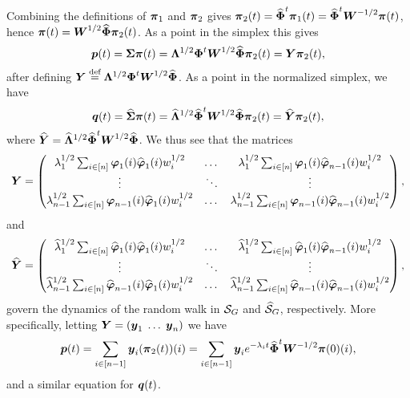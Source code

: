 Combining the  definitions of $\bpi_1$  and $\bpi_2$ gives $\bpi_2(t)  = \Eign^\tp \bpi_1(t) = \Eign^\tp \W^{-1/2}\bpi(t)$, hence 
$\bpi(t) = \W^{1/2} \Eign \bpi_2(t)$. As a point in the  simplex this gives 
\begin{equation*}
\p(t)  = \Sv\bpi(t) = \Eval^{1/2}\Eig^\tp \W^{1/2}\Eign \bpi_2(t) = \Y\bpi_2(t),
\end{equation*}
after defining $\Y\equiv \Eval^{1/2}\Eig^\tp \W^{1/2}\Eign$. As a point in the normalized simplex, we have 
\begin{equation*}
\q(t) = \Svn\bpi(t) = \Evaln^{1/2}\Eign^\tp\W^{1/2}\Eign\bpi_2(t) = \Yn\bpi_2(t),
\end{equation*}
where $\Yn= \Evaln^{1/2}\Eign^\tp\W^{1/2}\Eign$. We thus  see that the matrices 
\begin{equation*}
\Y = \begin{pmatrix}
\lambda_1^{1/2}\sum_{i\in[n]} \vp_1(i)\vpn_1(i) w_i^{1/2} & \dots &  \lambda_1^{1/2}\sum_{i\in[n]} \vp_1(i)\vpn_{n-1}(i) w_i^{1/2} \\
\vdots & \ddots & \vdots \\
\lambda_{n-1}^{1/2}\sum_{i\in[n]} \vp_{n-1}(i)\vpn_1(i) w_i^{1/2} & \dots &  \lambda_{n-1}^{1/2}\sum_{i\in[n]} \vp_{n-1}(i)\vpn_{n-1}(i) w_i^{1/2} 
\end{pmatrix},
\end{equation*}
and  
\begin{equation*}
\Yn  = \begin{pmatrix}
\lambdan_1^{1/2}\sum_{i\in[n]} \vpn_1(i)\vpn_1(i) w_i^{1/2} & \dots &  \lambdan_1^{1/2}\sum_{i\in[n]} \vpn_1(i)\vpn_{n-1}(i) w_i^{1/2} \\
\vdots & \ddots & \vdots \\
\lambdan_{n-1}^{1/2}\sum_{i\in[n]} \vpn_{n-1}(i)\vpn_1(i) w_i^{1/2} & \dots &  \lambdan_{n-1}^{1/2}\sum_{i\in[n]} \vpn_{n-1}(i)\vpn_{n-1}(i) w_i^{1/2} 
\end{pmatrix},
\end{equation*}
govern the dynamics of the random walk in  $\splx_G$ and $\splxn_G$, respectively.  More specifically, letting $\Y=(\y_1\;\dots\;\y_n)$ we have 
\[\p(t) = \sum_{i\in[n-1]} \y_i (\bpi_2(t))(i) = \sum_{i\in[n-1]}  \y_i e^{-\lambda_i t} \Eign^\tp \W^{-1/2}\bpi(0)(i),\]
and a similar  equation for $\q(t)$. 







